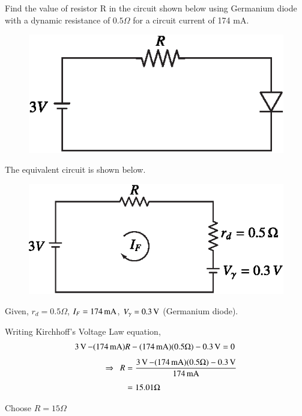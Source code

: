 \begin{example}\label{exam1.16}
Find the value of resistor R in the circuit shown below using
Germanium diode with a dynamic resistance of $0.5 \Omega$ for a
circuit current of 174 mA.
\begin{figure}[H]
\centering
\includegraphics{chap1/exp1.16.eps}
\end{figure}
\end{example}

\begin{solution}
The equivalent circuit is shown below.
\begin{figure}[H]
\centering
\includegraphics[scale=.95]{chap1/sol1.16.eps}
\end{figure}

Given, $r_d = 0.5 \Omega$, $I_F = 174 \operatorname{mA}$, $V_\gamma =0.3 \operatorname{\mathrm{V}}$
(Germanium diode). 

\smallskip

Writing Kirchhoff's Voltage Law equation,
\begin{align*}
3 \operatorname{\mathrm{V}} - (174 \operatorname{mA}) & R - (174 \operatorname{mA}) (0.5 \Omega) - 0.3 \operatorname{\mathrm{V}} = 0\\[4pt]
\Rightarrow ~~ R & = \frac{3\operatorname{\mathrm{V}} - (174 \operatorname{mA}) (0.5\Omega)-0.3 \operatorname{\mathrm{V}}}{174
  \operatorname{mA}}\\[4pt]
& = 15.01 \Omega
\end{align*} 

Choose $R = 15 \Omega$
\end{solution}

